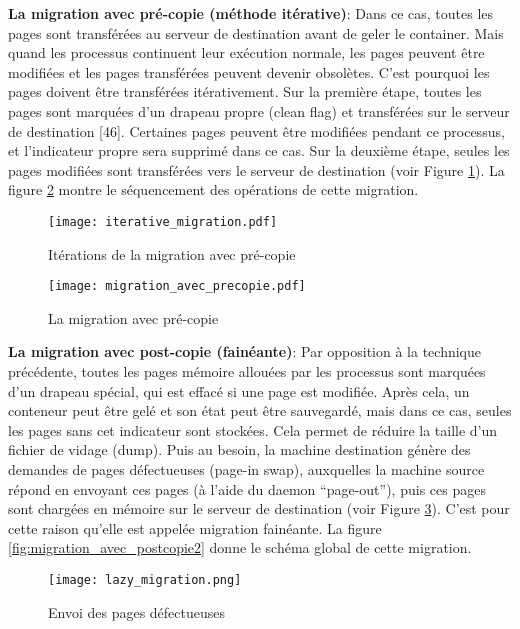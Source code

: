 \textbf{La migration avec pré-copie (méthode itérative)}: Dans ce cas, toutes les pages sont transférées au serveur de destination avant de geler le container. Mais quand les processus continuent leur exécution normale, les pages peuvent être modifiées et les pages transférées peuvent devenir obsolètes. C'est pourquoi les pages doivent être transférées itérativement. Sur la première étape, toutes les pages sont marquées d'un drapeau propre (clean flag) et transférées sur le serveur de destination [46]. Certaines pages peuvent être modifiées pendant ce processus, et l'indicateur propre sera supprimé dans ce cas. Sur la deuxième étape, seules les pages modifiées sont transférées vers le serveur de destination (voir Figure \ref{fig:migration_avec_precopie1}). La figure \ref{fig:migration_avec_precopie2} montre le séquencement des opérations de cette migration.\par
\begin{figure}[H]
\centering
\texttt{[image: iterative\_migration.pdf]}
\caption{Itérations de la migration avec pré-copie \cite{mirkin2008}}
\label{fig:migration_avec_precopie1}
\end{figure}
\begin{figure}[H]
\centering
\texttt{[image: migration\_avec\_precopie.pdf]}
\caption{La migration avec pré-copie \cite{puliafito2019}}
\label{fig:migration_avec_precopie2}
\end{figure}
\textbf{La migration avec post-copie (fainéante)}: Par opposition à la technique précédente, toutes les pages mémoire allouées par les processus sont marquées d'un drapeau spécial, qui est effacé si une page est modifiée. Après cela, un conteneur peut être gelé et son état peut être sauvegardé, mais dans ce cas, seules les pages sans cet indicateur sont stockées. Cela permet de réduire la taille d'un fichier de vidage (dump). Puis au besoin, la machine destination génère des demandes de pages défectueuses (page-in swap), auxquelles la machine source répond en envoyant ces pages (à l'aide du daemon “page-out”), puis ces pages sont chargées en mémoire sur le serveur de destination (voir Figure \ref{fig:migration_avec_postcopie1}). C'est pour cette raison qu'elle est appelée migration fainéante. La figure \ref{fig:migration_avec_postcopie2} donne le schéma global de cette migration.\par
\begin{figure}[H]
\centering
\texttt{[image: lazy\_migration.png]}
\caption{Envoi des pages défectueuses \cite{mirkin2008}}
\label{fig:migration_avec_postcopie1}
\end{figure}

